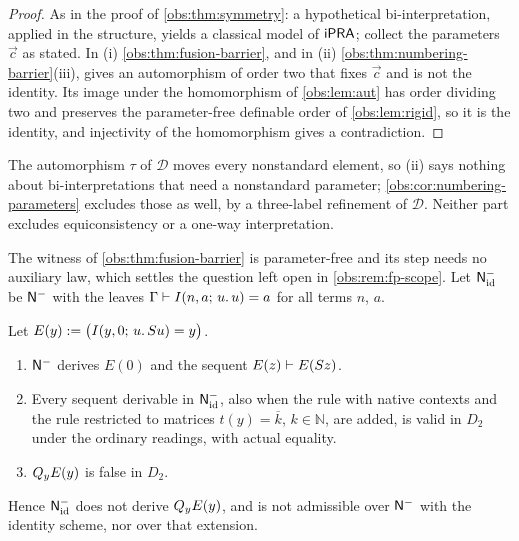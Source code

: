 \begin{proof}
As in the proof of \cref{obs:thm:symmetry}: a hypothetical bi-interpretation,
applied in the structure, yields a classical model of $\mathsf{iPRA}$; collect the
parameters $\vec c$ as stated. In (i) \cref{obs:thm:fusion-barrier}, and in
(ii) \cref{obs:thm:numbering-barrier}(iii), gives an automorphism of order two
that fixes $\vec c$ and is not the identity. Its image under the homomorphism
of \cref{obs:lem:aut} has order dividing two and preserves the parameter-free
definable order of \cref{obs:lem:rigid}, so it is the identity, and injectivity
of the homomorphism gives a contradiction.
\end{proof}

The automorphism $\tau$ of $\mathcal{D}$ moves every nonstandard element, so
(ii) says nothing about bi-interpretations that need a nonstandard parameter;
\cref{obs:cor:numbering-parameters} excludes those as well, by a three-label
refinement of $\mathcal{D}$. Neither part excludes equiconsistency or a one-way
interpretation.

The witness of \cref{obs:thm:fusion-barrier} is parameter-free and its step
needs no auxiliary law, which settles the question left open in
\cref{obs:rem:fp-scope}. Let $\mathsf{N}^{-}_{\mathrm{id}}$ be $\mathsf{N}^{-}$ with the
leaves $\Gamma\vdash I(n,a;\,u.\,u)=a$ for all terms $n$, $a$.

\begin{corollary}
\label{obs:cor:qi-identity}
Let $E(y)\mathrel{:=}\bigl(I(y,0;\,u.\,S u)=y\bigr)$.
\begin{enumerate}[label=(\roman*)]
\item $\mathsf{N}^{-}$ derives $E(0)$ and the sequent $E(z)\vdash E(S z)$.
\item Every sequent derivable in $\mathsf{N}^{-}_{\mathrm{id}}$, also when the rule
 with native contexts and the rule  restricted
to matrices $t(y)=\overline{k}$, $k\in\mathbb{N}$, are added, is valid in
$D_2$ under the ordinary readings, with actual equality.
\item $Q_{y}E(y)$ is false in $D_2$.
\end{enumerate}
Hence $\mathsf{N}^{-}_{\mathrm{id}}$ does not derive $Q_{y}E(y)$, and 
is not admissible over $\mathsf{N}^{-}$ with the identity scheme, nor over that
extension.
\end{corollary}

